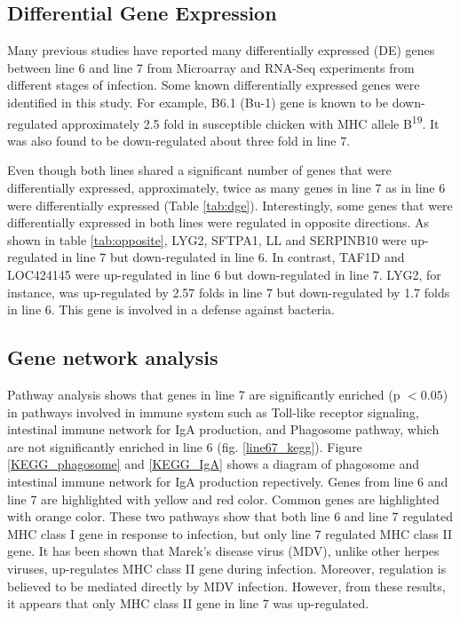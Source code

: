 \documentclass[10pt]{article}
\begin{document}
\subsection*{Differential Gene Expression}
Many previous studies have reported many differentially expressed (DE) genes between line 6 and line 7
from Microarray and RNA-Seq experiments from different stages of infection.
Some known differentially expressed genes were identified in this study.
For example, B6.1 (Bu-1) gene is known to be down-regulated approximately 2.5 fold in susceptible
chicken with MHC allele B\textsuperscript{19}\cite{}. It was also found to be down-regulated
about three fold in line 7.

Even though both lines shared a significant number of genes that were differentially expressed,
approximately, twice as many genes in line 7 as in line 6 were differentially expressed (Table \ref{tab:dge}).
Interestingly, some genes that were differentially expressed in both lines were
regulated in opposite directions.
As shown in table \ref{tab:opposite}, LYG2, SFTPA1, LL and SERPINB10 were up-regulated in line 7 but down-regulated in line 6.
In contrast, TAF1D and LOC424145 were up-regulated in line 6 but down-regulated in line 7.
LYG2, for instance, was up-regulated by 2.57 folds in line 7 but down-regulated by 1.7 folds in line 6.
This gene is involved in a defense against bacteria.

\subsection*{Gene network analysis}
Pathway analysis shows that genes in line 7 are significantly enriched (p $< 0.05$) in pathways involved in
immune system such as Toll-like receptor signaling, intestinal immune network for IgA production,
and Phagosome pathway, which are not significantly enriched in line 6 (fig. \ref{line67_kegg}).
Figure \ref{KEGG_phagosome} and \ref{KEGG_IgA} shows a diagram of phagosome and intestinal immune network
for IgA production repectively. Genes from line 6 and line 7 are highlighted with yellow and red color.
Common genes are highlighted with orange color.
These two pathways show that both line 6 and line 7 regulated MHC class I gene in response to infection,
but only line 7 regulated MHC class II gene.
It has been shown that Marek's disease virus (MDV), unlike other herpes viruses, up-regulates MHC class II gene
during infection. Moreover, regulation is believed to be mediated directly by MDV infection\cite{Niikura:2007fq}.
However, from these results, it appears that only MHC class II gene in line 7 was up-regulated.
\end{document}
